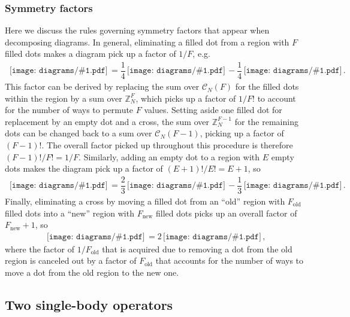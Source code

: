 \documentclass[nofootinbib,notitlepage,11pt]{revtex4-2}
\renewcommand{\t}{\text} %
\newcommand{\f}[2]{\dfrac{#1}{#2}} %
\newcommand{\p}[1]{\left(#1\right)} %
\newcommand{\1}{\mathds{1}}
\newcommand{\C}{\mathcal{C}}
\newcommand{\ZZ}{\mathbb{Z}}
\newcommand{\diagram}[1]
{\,\texttt{[image: diagrams/\#1.pdf]}\,}
\begin{document}
\subsubsection{Symmetry factors}

Here we discuss the rules governing symmetry factors that appear when
decomposing diagrams.  In general, eliminating a filled dot from a
region with $F$ filled dots makes a diagram pick up a factor of $1/F$,
e.g.
\begin{align}
  \diagram{example_sym}
  = \f14 \diagram{example_sym_o}
  - \f14 \diagram{example_sym_x}.
\end{align}
This factor can be derived by replacing the sum over $\C_N\p{F}$ for
the filled dots within the region by a sum over $\ZZ_N^{F}$, which
picks up a factor of $1/F!$ to account for the number of ways to
permute $F$ values.  Setting aside one filled dot for replacement by
an empty dot and a cross, the sum over $\ZZ_N^{F-1}$ for the remaining
dots can be changed back to a sum over $\C_N\p{F-1}$, picking up a
factor of $\p{F-1}!$.  The overall factor picked up throughout this
procedure is therefore $\p{F-1}!/F!=1/F$.  Similarly, adding an empty
dot to a region with $E$ empty dots makes the diagram pick up a factor
of $\p{E+1}!/E!=E+1$, so
\begin{align}
  \diagram{example_sym_o}
  = \f23 \diagram{example_sym_oo}
  - \f13 \diagram{example_sym_ox}.
\end{align}
Finally, eliminating a cross by moving a filled dot from an ``old''
region with $F_{\t{old}}$ filled dots into a ``new'' region with
$F_{\t{new}}$ filled dots picks up an overall factor of
$F_{\t{new}}+1$, so
\begin{align}
  \diagram{example_sym_x}
  = 2 \diagram{example_sym_x_elim},
\end{align}
where the factor of $1/F_{\t{old}}$ that is acquired due to removing a
dot from the old region is canceled out by a factor of $F_{\t{old}}$
that accounts for the number of ways to move a dot from the old region
to the new one.

\subsection{Two single-body operators}
\label{sec:PXYP}
\end{document}
